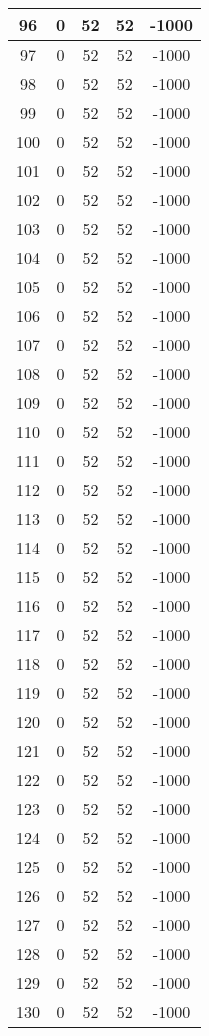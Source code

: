 \documentclass[letterpaper, 12pt]{article}
\begin{document}
\begin{longtable}{|c|c|c|c|c|}
\hline
96 & 0 & 52 & 52 & -1000 \\
\hline
97 & 0 & 52 & 52 & -1000 \\
\hline
98 & 0 & 52 & 52 & -1000 \\
\hline
99 & 0 & 52 & 52 & -1000 \\
\hline
100 & 0 & 52 & 52 & -1000 \\
\hline
101 & 0 & 52 & 52 & -1000 \\
\hline
102 & 0 & 52 & 52 & -1000 \\
\hline
103 & 0 & 52 & 52 & -1000 \\
\hline
104 & 0 & 52 & 52 & -1000 \\
\hline
105 & 0 & 52 & 52 & -1000 \\
\hline
106 & 0 & 52 & 52 & -1000 \\
\hline
107 & 0 & 52 & 52 & -1000 \\
\hline
108 & 0 & 52 & 52 & -1000 \\
\hline
109 & 0 & 52 & 52 & -1000 \\
\hline
110 & 0 & 52 & 52 & -1000 \\
\hline
111 & 0 & 52 & 52 & -1000 \\
\hline
112 & 0 & 52 & 52 & -1000 \\
\hline
113 & 0 & 52 & 52 & -1000 \\
\hline
114 & 0 & 52 & 52 & -1000 \\
\hline
115 & 0 & 52 & 52 & -1000 \\
\hline
116 & 0 & 52 & 52 & -1000 \\
\hline
117 & 0 & 52 & 52 & -1000 \\
\hline
118 & 0 & 52 & 52 & -1000 \\
\hline
119 & 0 & 52 & 52 & -1000 \\
\hline
120 & 0 & 52 & 52 & -1000 \\
\hline
121 & 0 & 52 & 52 & -1000 \\
\hline
122 & 0 & 52 & 52 & -1000 \\
\hline
123 & 0 & 52 & 52 & -1000 \\
\hline
124 & 0 & 52 & 52 & -1000 \\
\hline
125 & 0 & 52 & 52 & -1000 \\
\hline
126 & 0 & 52 & 52 & -1000 \\
\hline
127 & 0 & 52 & 52 & -1000 \\
\hline
128 & 0 & 52 & 52 & -1000 \\
\hline
129 & 0 & 52 & 52 & -1000 \\
\hline
130 & 0 & 52 & 52 & -1000 \\

\end{longtable}
\end{document}
